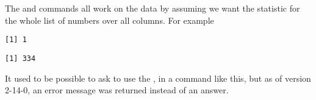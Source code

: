 The  and  commands all work on the data by assuming we want the statistic for the whole list of numbers over all columns. For example 
\begin{knitrout}
\color{fgcolor}\begin{kframe}
\begin{alltt}
\hlstd{> }
\hlstd{> }\hlstd{(airquality[,}\hlopt{:}\hlstd{],} \hlstd{=}\hlstd{)}
\end{alltt}
\begin{verbatim}
[1] 1
\end{verbatim}
\begin{alltt}
\hlstd{> }\hlstd{(airquality[,}\hlopt{:}\hlstd{],} \hlstd{=}\hlstd{)}
\end{alltt}
\begin{verbatim}
[1] 334
\end{verbatim}
\end{kframe}
\end{knitrout}
 
It used to be possible to ask \R{} to use the , in a command like this, but as of version 2-14-0, an error message was returned instead of an answer. 
 
